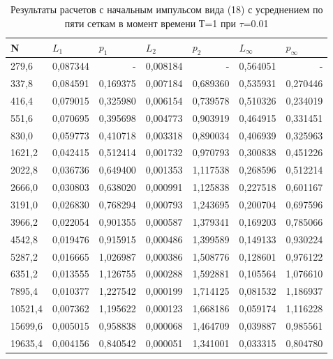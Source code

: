 \documentclass[14pt]{article}
\begin{document}
\begin{table}[H]
\caption{Результаты расчетов с начальным импульсом вида (18) с усреднением по пяти сеткам в момент времени Т=1 при $\tau$=0.01}
\begin{tabular}{|l|l|l|l|l|l|l|}
\hline
\multicolumn{1}{|l|}{N} & \multicolumn{1}{l|}{$L_1$}        & \multicolumn{1}{l|}{$p_1$} & \multicolumn{1}{l|}{$L_2$}     & \multicolumn{1}{l|}{$p_2$} & \multicolumn{1}{l|}{$L_\infty$} & \multicolumn{1}{l|}{$p_\infty$} \\ \hline
279,6   & 0,087344 & \multicolumn{1}{r|}{-} & 0,008184 & \multicolumn{1}{r|}{-}        & 0,564051 & \multicolumn{1}{r|}{-} \\ \hline
337,8   & 0,084591 & 0,169375               & 0,007184 & 0,689360 & 0,535931 & 0,270446               \\ \hline
416,4   & 0,079015 & 0,325980               & 0,006154 & 0,739578 & 0,510326 & 0,234019               \\ \hline
551,6   & 0,070695 & 0,395698               & 0,004773 & 0,903919 & 0,464915 & 0,331451               \\ \hline
830,0   & 0,059773 & 0,410718               & 0,003318 & 0,890034 & 0,406939 & 0,325963               \\ \hline
1621,2  & 0,042415 & 0,512414               & 0,001732 & 0,970793 & 0,300838 & 0,451226               \\ \hline
2022,8  & 0,036736 & 0,649400               & 0,001353 & 1,117538 & 0,268596 & 0,512214               \\ \hline
2666,0  & 0,030803 & 0,638020               & 0,000991 & 1,125838 & 0,227518 & 0,601167               \\ \hline
3191,0  & 0,026830 & 0,768294               & 0,000793 & 1,243695 & 0,200704 & 0,697596               \\ \hline
3966,2  & 0,022054 & 0,901355               & 0,000587 & 1,379341 & 0,169203 & 0,785066               \\ \hline
4542,8  & 0,019476 & 0,915915               & 0,000486 & 1,399589 & 0,149133 & 0,930224               \\ \hline
5287,2  & 0,016665 & 1,026987               & 0,000386 & 1,508776 & 0,128601 & 0,976122               \\ \hline
6351,2  & 0,013555 & 1,126755               & 0,000288 & 1,592881 & 0,105564 & 1,076610               \\ \hline
7895,4  & 0,010377 & 1,227542               & 0,000199 & 1,714125 & 0,081532 & 1,186937               \\ \hline
10521,4 & 0,007362 & 1,195622               & 0,000123 & 1,668186 & 0,059174 & 1,116228               \\ \hline
15699,6 & 0,005015 & 0,958838               & 0,000068 & 1,464709 & 0,039887 & 0,985561               \\ \hline
19635,4 & 0,004156 & 0,840542               & 0,000051 & 1,341001 & 0,033315 & 0,804780               \\ \hline
\end{tabular}

\end{table}
\end{document}
